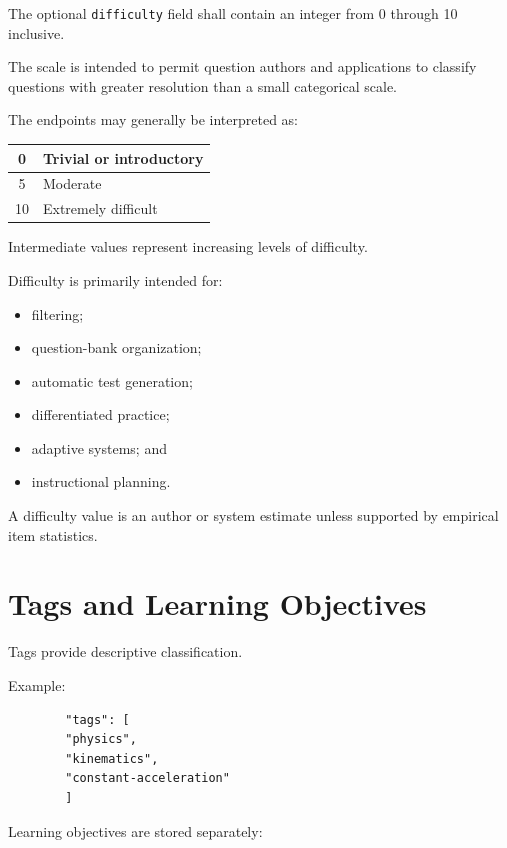 \documentclass[11pt]{article}
\begin{document}
	The optional \texttt{difficulty} field shall contain an integer from
	0 through 10 inclusive.
	
	The scale is intended to permit question authors and applications to
	classify questions with greater resolution than a small categorical scale.
	
	The endpoints may generally be interpreted as:
	
	\begin{center}
		\begin{tabular}{|c|l|}
			\hline
			0 & Trivial or introductory \\ \hline
			5 & Moderate \\ \hline
			10 & Extremely difficult \\ \hline
		\end{tabular}
	\end{center}
	
	Intermediate values represent increasing levels of difficulty.
	
	Difficulty is primarily intended for:
	
	\begin{itemize}
		\item filtering;
		\item question-bank organization;
		\item automatic test generation;
		\item differentiated practice;
		\item adaptive systems; and
		\item instructional planning.
	\end{itemize}
	
	A difficulty value is an author or system estimate unless supported by
	empirical item statistics.
	
	\section{Tags and Learning Objectives}
	
	Tags provide descriptive classification.
	
	Example:
	
	\begin{lstlisting}
		"tags": [
		"physics",
		"kinematics",
		"constant-acceleration"
		]
	\end{lstlisting}
	
	Learning objectives are stored separately:
	
\end{document}
